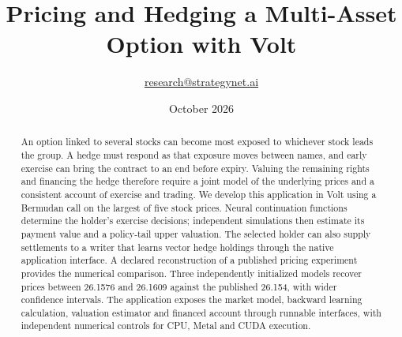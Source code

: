 \documentclass[8pt]{strategynet-journal}
\title{Pricing and Hedging a Multi-Asset Option with Volt}
\author{\href{mailto:research@strategynet.ai}{research@strategynet.ai}}
\date{October 2026}
\begin{document}
\maketitle
\begin{abstract}
\normalsize An option linked to several stocks can become most exposed to whichever stock leads the group. A hedge must respond as that exposure moves between names, and early exercise can bring the contract to an end before expiry. Valuing the remaining rights and financing the hedge therefore require a joint model of the underlying prices and a consistent account of exercise and trading. We develop this application in Volt using a Bermudan call on the largest of five stock prices. Neural continuation functions determine the holder's exercise decisions; independent simulations then estimate its payment value and a policy-tail upper valuation. The selected holder can also supply settlements to a writer that learns vector hedge holdings through the native application interface. A declared reconstruction of a published pricing experiment provides the numerical comparison. Three independently initialized models recover prices between 26.1576 and 26.1609 against the published 26.154, with wider confidence intervals. The application exposes the market model, backward learning calculation, valuation estimator and financed account through runnable interfaces, with independent numerical controls for CPU, Metal and CUDA execution.
\end{abstract}
\SNtwocolumntableofcontents
\end{document}
